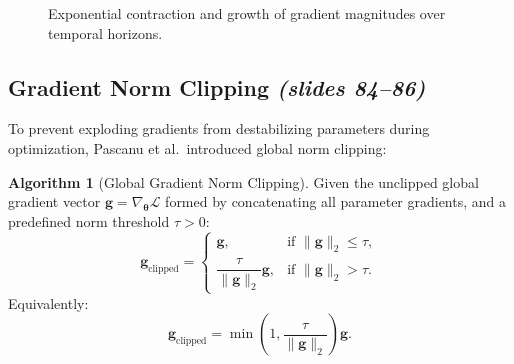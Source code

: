 \documentclass[11pt,a4paper]{article}
\theoremstyle{definition}
\newtheorem{algorithm}{Algorithm}[section]
\theoremstyle{plain}
\begin{document}
\begin{figure}[htbp]
\centering
{}
\caption{Exponential contraction and growth of gradient magnitudes over temporal horizons.}
\end{figure}

\subsection{Gradient Norm Clipping \emph{(slides 84--86)}}
To prevent exploding gradients from destabilizing parameters during optimization, Pascanu et al.\ introduced global norm clipping:

\begin{algorithm}[Global Gradient Norm Clipping]
Given the unclipped global gradient vector $\mathbf{g} = \nabla_{\boldsymbol{\theta}} \mathcal{L}$ formed by concatenating all parameter gradients, and a predefined norm threshold $\tau > 0$:
\begin{equation}
    \mathbf{g}_{\text{clipped}} = \begin{cases}
        \mathbf{g}, & \text{if } \|\mathbf{g}\|_2 \le \tau, \\
        \dfrac{\tau}{\|\mathbf{g}\|_2} \mathbf{g}, & \text{if } \|\mathbf{g}\|_2 > \tau.
    \end{cases}
\end{equation}
Equivalently:
\begin{equation}
    \mathbf{g}_{\text{clipped}} = \min\left(1, \frac{\tau}{\|\mathbf{g}\|_2}\right) \mathbf{g}.
\end{equation}
\end{algorithm}
\end{document}
